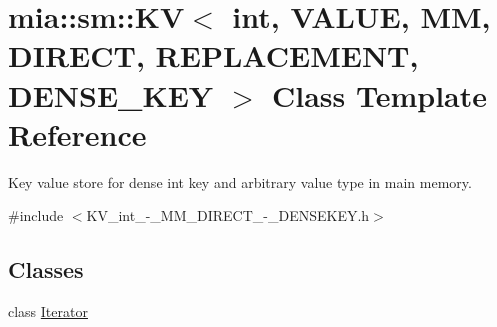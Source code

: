 \hypertarget{classmia_1_1sm_1_1_k_v_3_01int_00_01_v_a_l_u_e_00_01_m_m_00_01_d_i_r_e_c_t_00_01_r_e_p_l_a_c_e_mff62509bd7761c1266e42e615210b694}{\section{mia\-:\-:sm\-:\-:K\-V$<$ int, V\-A\-L\-U\-E, M\-M, D\-I\-R\-E\-C\-T, R\-E\-P\-L\-A\-C\-E\-M\-E\-N\-T, D\-E\-N\-S\-E\-\_\-\-K\-E\-Y $>$ Class Template Reference}
\label{classmia_1_1sm_1_1_k_v_3_01int_00_01_v_a_l_u_e_00_01_m_m_00_01_d_i_r_e_c_t_00_01_r_e_p_l_a_c_e_mff62509bd7761c1266e42e615210b694}
}


Key value store for dense int key and arbitrary value type in main memory.  




{\ttfamily \#include $<$K\-V\-\_\-int\-\_\--\/\-\_\-\-M\-M\-\_\-\-D\-I\-R\-E\-C\-T\-\_\--\/\-\_\-\-D\-E\-N\-S\-E\-K\-E\-Y.\-h$>$}

\subsection*{Classes}
\begin{DoxyCompactItemize}
\item 
class \hyperlink{classmia_1_1sm_1_1_k_v_3_01int_00_01_v_a_l_u_e_00_01_m_m_00_01_d_i_r_e_c_t_00_01_r_e_p_l_a_c_e_m00136a9f08c6f99ce3723959776b6b87}{Iterator}
\end{DoxyCompactItemize}
